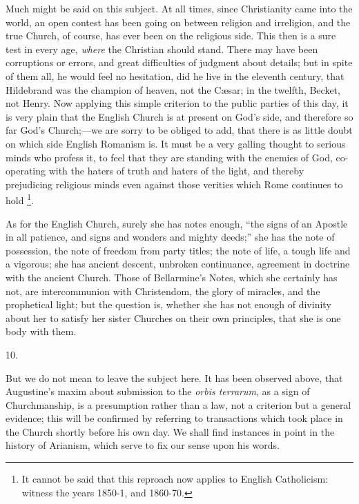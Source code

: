 Much might be said on this subject. At all times,
since Christianity came into the world, an open contest has been going
on between religion and irreligion, and the true Church, of course,
has ever been on the religious side. This then is a sure test in every
age, \emph{where} the Christian should stand. There may have been
corruptions or errors, and great difficulties of judgment about
details; but in spite of them all, he would feel no hesitation, did he
live in the eleventh century, that Hildebrand was the champion of
heaven, not the Cæsar; in the twelfth, Becket, not Henry. Now
applying this simple criterion to the public parties of this day, it
is very plain that the English Church is at present on God's side,
and therefore so far God's Church;—we are sorry to be obliged to
add, that there is as little doubt on which side English Romanism is.
It must be a very galling thought to serious minds who profess it, to
feel that they are standing with the enemies of God, co-operating with
the haters of truth and haters of the light, and thereby prejudicing
religious minds even against those verities which Rome continues to
hold \footnote{It cannot be said that this reproach now
applies to English Catholicism: witness the years 1850-1, and 1860-70.}.

As for the English Church, surely she has notes
enough, ``the signs of an Apostle in all patience, and signs
and wonders and mighty deeds;'' she has the note of possession, the
note of freedom from party titles; the note of life, a tough life and
a vigorous; she has ancient descent, unbroken continuance, agreement
in doctrine with the ancient Church. Those of Bellarmine's Notes,
which she certainly has not, are intercommunion with Christendom, the
glory of miracles, and the prophetical light; but the question is,
whether she has not enough of divinity about her to satisfy her sister
Churches on their own principles, that she is one body with them.

10.

But we do not mean to leave the subject here. It
has been observed above, that Augustine's maxim about submission to
the \emph{orbis terrarum}, as a sign of Churchmanship, is a
presumption rather than a law, not a criterion but a general evidence;
this will be confirmed by referring to transactions which took place
in the Church shortly before his own day. We shall find instances in
point in the history of Arianism, which serve to fix our sense upon
his words.

